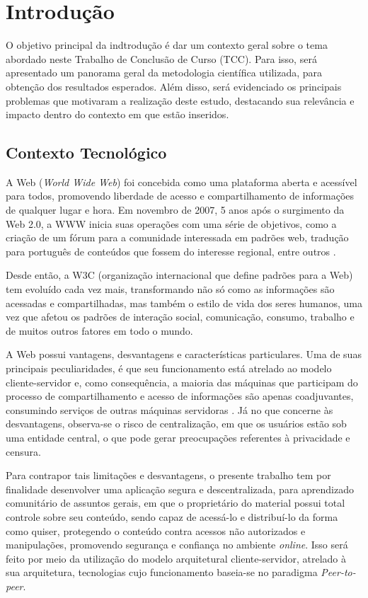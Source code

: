 \chapter[Introdução]{Introdução}
\label{cap:introducao}

O objetivo principal da indtrodução é dar um contexto geral sobre o tema abordado neste Trabalho de Conclusão de Curso (TCC). Para isso, será apresentado um panorama geral da metodologia científica utilizada, para obtenção dos resultados esperados. Além disso, será evidenciado os principais problemas que motivaram a realização deste estudo, destacando sua relevância e impacto dentro do contexto em que estão inseridos. 

\section{Contexto Tecnológico}

A Web (\textit{World Wide Web}) foi concebida como uma plataforma aberta e acessível para todos, promovendo liberdade de acesso e compartilhamento de informações de qualquer lugar e hora. Em novembro de 2007, 5 anos após o surgimento da Web 2.0, a WWW inicia suas operações com uma série de objetivos, como a criação de um fórum para a comunidade interessada em padrões web, tradução para português de conteúdos que fossem do interesse regional, entre outros \cite{vieira2014}.

Desde então, a W3C (organização internacional que define padrões para a Web) tem evoluído cada vez mais, transformando não só como as informações são acessadas e compartilhadas, mas também o estilo de vida dos seres humanos, uma vez que afetou os padrões de interação social, comunicação, consumo, trabalho e de muitos outros fatores em todo o mundo.

A Web possui vantagens, desvantagens e características particulares. Uma de suas principais peculiaridades, é que seu funcionamento está atrelado ao modelo cliente-servidor e, como consequência, a maioria das máquinas que participam do processo de compartilhamento e acesso de informações são apenas coadjuvantes, consumindo serviços de outras máquinas servidoras \cite{rocha2004p2p}. Já no que concerne às desvantagens, observa-se o risco de centralização, em que os usuários estão sob uma entidade central, o que pode gerar preocupações referentes à privacidade e censura. 

Para contrapor tais limitações e desvantagens, o presente trabalho tem por finalidade desenvolver uma aplicação segura e descentralizada, para aprendizado comunitário de assuntos gerais, em que o proprietário do material possui total controle sobre seu conteúdo, sendo capaz de acessá-lo e distribuí-lo da forma como quiser, protegendo o conteúdo contra acessos não autorizados e manipulações, promovendo segurança e confiança no ambiente \textit{online}. Isso será feito por meio da utilização do modelo arquitetural cliente-servidor, atrelado à sua arquitetura, tecnologias cujo funcionamento baseia-se no paradigma \textit{Peer-to-peer}.

